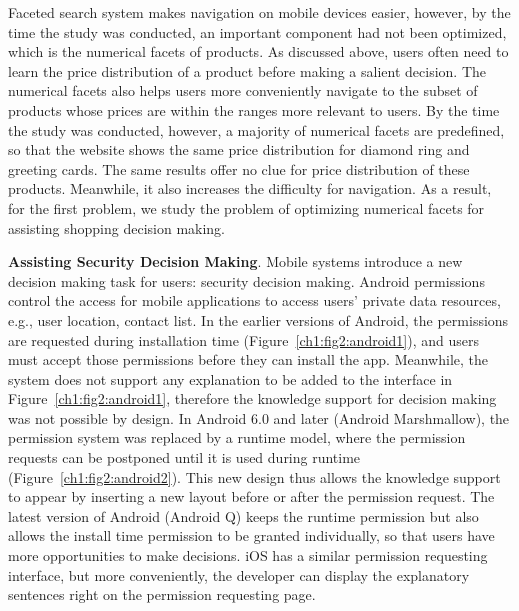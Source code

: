 Faceted search system makes navigation on mobile devices easier, however, by the time the study was conducted, an important component had not been optimized, which is the numerical facets of products. As discussed above, users often need to learn the price distribution of a product before making a salient decision. The numerical facets also helps users more conveniently navigate to the subset of products whose prices are within the ranges more relevant to users. By the time the study was conducted, however, a majority of numerical facets are predefined, so that the website shows the same price distribution for diamond ring and greeting cards. The same results offer no clue for price distribution of these products. Meanwhile, it also increases the difficulty for navigation. As a result, for the first problem, we study the problem of optimizing numerical facets for assisting shopping decision making. 

\textbf{Assisting Security Decision Making}. Mobile systems introduce a new decision making task for users: security decision making. Android permissions control the access for mobile applications to access users' private data resources, e.g., user location, contact list. In the earlier versions of Android, the permissions are requested during installation time (Figure~\ref{ch1:fig2:android1}), and users must accept those permissions before they can install the app. Meanwhile, the system does not support any explanation to be added to the interface in Figure~\ref{ch1:fig2:android1}, therefore the knowledge support for decision making was not possible by design. In Android 6.0 and later (Android Marshmallow), the permission system was replaced by a runtime model, where the permission requests can be postponed until it is used during runtime (Figure~\ref{ch1:fig2:android2}). This new design thus allows the knowledge support to appear by inserting a new layout before or after the permission request. The latest version of Android (Android Q) keeps the runtime permission but also allows the install time permission to be granted individually, so that users have more opportunities to make decisions. iOS has a similar permission requesting interface, but more conveniently, the developer can display the explanatory sentences right on the permission requesting page. 

